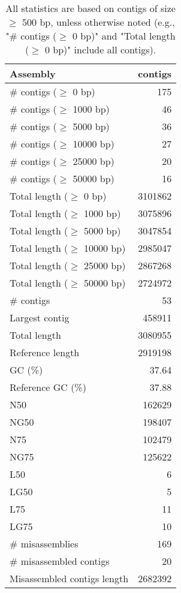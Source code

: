 \documentclass[12pt,a4paper]{article}
\begin{document}
\begin{table}[ht]
\begin{center}
\caption{All statistics are based on contigs of size $\geq$ 500 bp, unless otherwise noted (e.g., "\# contigs ($\geq$ 0 bp)" and "Total length ($\geq$ 0 bp)" include all contigs).}
\begin{tabular}{|l*{1}{|r}|}
\hline
Assembly & contigs \\ \hline
\# contigs ($\geq$ 0 bp) & 175 \\ \hline
\# contigs ($\geq$ 1000 bp) & 46 \\ \hline
\# contigs ($\geq$ 5000 bp) & 36 \\ \hline
\# contigs ($\geq$ 10000 bp) & 27 \\ \hline
\# contigs ($\geq$ 25000 bp) & 20 \\ \hline
\# contigs ($\geq$ 50000 bp) & 16 \\ \hline
Total length ($\geq$ 0 bp) & 3101862 \\ \hline
Total length ($\geq$ 1000 bp) & 3075896 \\ \hline
Total length ($\geq$ 5000 bp) & 3047854 \\ \hline
Total length ($\geq$ 10000 bp) & 2985047 \\ \hline
Total length ($\geq$ 25000 bp) & 2867268 \\ \hline
Total length ($\geq$ 50000 bp) & 2724972 \\ \hline
\# contigs & 53 \\ \hline
Largest contig & 458911 \\ \hline
Total length & 3080955 \\ \hline
Reference length & 2919198 \\ \hline
GC (\%) & 37.64 \\ \hline
Reference GC (\%) & 37.88 \\ \hline
N50 & 162629 \\ \hline
NG50 & 198407 \\ \hline
N75 & 102479 \\ \hline
NG75 & 125622 \\ \hline
L50 & 6 \\ \hline
LG50 & 5 \\ \hline
L75 & 11 \\ \hline
LG75 & 10 \\ \hline
\# misassemblies & 169 \\ \hline
\# misassembled contigs & 20 \\ \hline
Misassembled contigs length & 2682392 \\ \hline

\end{tabular}
\end{center}
\end{table}
\end{document}
